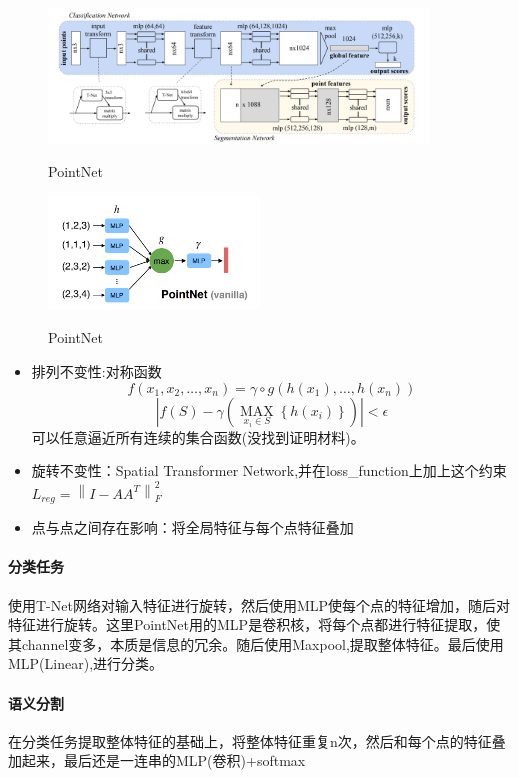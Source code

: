 \documentclass[a4paper,12pt]{article}
\begin{document}
	\begin{figure}[H]
	\begin{center}
		\includegraphics[width=0.9\textwidth]{img/PointNet.png} 
		\caption{PointNet}
	\end{center}
\end{figure}

	\begin{figure}[H]
	\begin{center}
		\includegraphics[width=0.5\textwidth]{img/symmetry.png} 
		\caption{PointNet}
	\end{center}
\end{figure}

\begin{itemize}
	\item 排列不变性:对称函数
	$$
	f\left(x_{1}, x_{2}, \ldots, x_{n}\right) =\gamma \circ g\left(h\left(x_{1}\right), \ldots, h\left(x_{n}\right)\right)
	$$
	$$
	\left|f(S)-\gamma\left(\underset{x_{i} \in S}{\operatorname{MAX}}\left\{h\left(x_{i}\right)\right\}\right)\right|<\epsilon
	$$
	可以任意逼近所有连续的集合函数(没找到证明材料)。
	\item 旋转不变性：Spatial Transformer Network,并在loss\_function上加上这个约束 $L_{r e g}=\left\|I-A A^{T}\right\|_{F}^{2}$
	\item  点与点之间存在影响：将全局特征与每个点特征叠加
\end{itemize}
\paragraph{分类任务}
使用T-Net网络对输入特征进行旋转，然后使用MLP使每个点的特征增加，随后对特征进行旋转。这里PointNet用的MLP是卷积核，将每个点都进行特征提取，使其channel变多，本质是信息的冗余。随后使用Maxpool,提取整体特征。最后使用MLP(Linear),进行分类。
\paragraph{语义分割} 在分类任务提取整体特征的基础上，将整体特征重复n次，然后和每个点的特征叠加起来，最后还是一连串的MLP(卷积)+softmax
\end{document}
